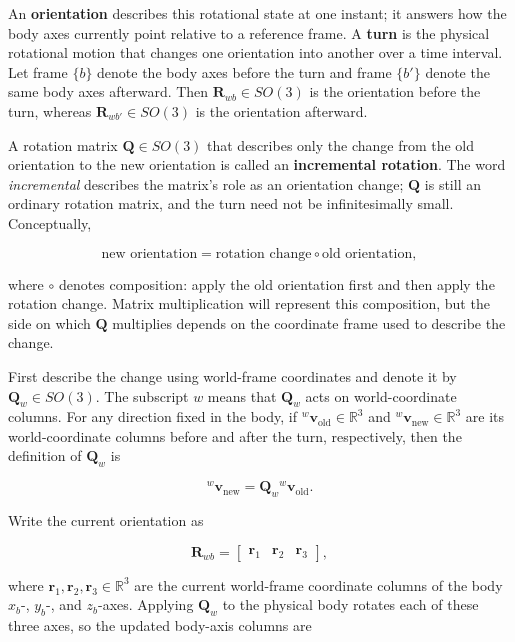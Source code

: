\documentclass[
  australian,
  12pt,
  letterpaper,
  DIV=11,
  numbers=noendperiod,
  twoside]{scrreprt}
\begin{document}
An \textbf{orientation} describes this rotational state at one instant;
it answers how the body axes currently point relative to a reference
frame. A \textbf{turn} is the physical rotational motion that changes
one orientation into another over a time interval. Let frame \(\{b\}\)
denote the body axes before the turn and frame \(\{b'\}\) denote the
same body axes afterward. Then \(\mathbf R_{wb}\in SO(3)\) is the
orientation before the turn, whereas \(\mathbf R_{wb'}\in SO(3)\) is the
orientation afterward.

A rotation matrix \(\mathbf Q\in SO(3)\) that describes only the change
from the old orientation to the new orientation is called an
\textbf{incremental rotation}. The word \emph{incremental} describes the
matrix's role as an orientation change; \(\mathbf Q\) is still an
ordinary rotation matrix, and the turn need not be infinitesimally
small. Conceptually,

\[
\boxed{
\text{new orientation}
=
\text{rotation change}
\mathbin{\circ}
\text{old orientation}
},
\]

where \(\circ\) denotes composition: apply the old orientation first and
then apply the rotation change. Matrix multiplication will represent
this composition, but the side on which \(\mathbf Q\) multiplies depends
on the coordinate frame used to describe the change.

First describe the change using world-frame coordinates and denote it by
\(\mathbf Q_w\in SO(3)\). The subscript \(w\) means that \(\mathbf Q_w\)
acts on world-coordinate columns. For any direction fixed in the body,
if \({}^{w}\mathbf v_{\mathrm{old}}\in\mathbb R^3\) and
\({}^{w}\mathbf v_{\mathrm{new}}\in\mathbb R^3\) are its
world-coordinate columns before and after the turn, respectively, then
the definition of \(\mathbf Q_w\) is

\[
{}^{w}\mathbf v_{\mathrm{new}}
=
\mathbf Q_w{}^{w}\mathbf v_{\mathrm{old}}.
\]

Write the current orientation as

\[
\mathbf R_{wb}
=
\begin{bmatrix}
\mathbf r_1&\mathbf r_2&\mathbf r_3
\end{bmatrix},
\]

where \(\mathbf r_1,\mathbf r_2,\mathbf r_3\in\mathbb R^3\) are the
current world-frame coordinate columns of the body \(x_b\)-, \(y_b\)-,
and \(z_b\)-axes. Applying \(\mathbf Q_w\) to the physical body rotates
each of these three axes, so the updated body-axis columns are
\end{document}

